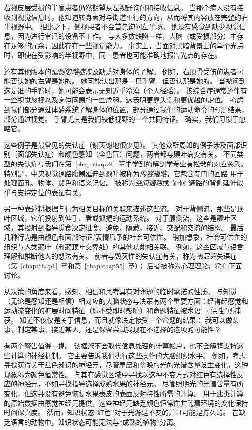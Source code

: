 右视皮层受损的半盲患者仍然期望从左视野询问和接收信息。
当那个病人没有接收到视觉信息时，他知道转身面对与街道平行的方向，从而将其内容放在完整的右半视野中。
相比之下，侧视患者不会首先询问左半场。
她没有感觉到缺少视觉信息，因为进行审讯的设备不工作。
与大多数缺陷一样，大脑（或受损部分）中存在足够的冗余，因此存在一些视觉能力。
事实上，当面对黑暗背景上的单个光点时，即使在受影响的半视野中，同一患者也可能准确地报告光点的存在。


还有其他版本的\textit{偏侧忽略症}涉及缺乏对身体的了解。
例如，右顶骨受伤的患者可能否认她的左臂是她的。
她可能认出那是一只手臂，但否认那是她的。
当被问到这是谁的手臂时，她可能会表示无知近乎冷漠（个人经验）。
该综合症通常还伴有一些视觉忽视以及身体同侧的一些虚弱，这表明更靠头侧和更优越的定位。
考虑到我们部分通过体感系统了解身体的位置，部分通过我们的运动命令的预测结果，部分通过视觉。
手臂尤其是我们较低视野的一个共同特征。
确实，我们习惯于忽略它。


这些例子是最常见的失认症（谢天谢地很少见）。
其他众所周知的例子涉及面部识别（面部失认症）和颜色感知（全色盲）问题，两者都与颞叶病变有关。
不同类型的失认症与我们在第~\ref{chap:chap24}~章中学到的解剖学专业有松散的对应关系。
特别是，中央视觉通路腹侧延伸到颞叶被称为\textit{内容通路}，它包含专门的回路 用于处理面孔、物体、颜色和语义记忆。
被称为\textit{空间通路}或“如何”通路的背侧延伸似乎与支持定位的表征有关。


另一种表述将根据与行为相关目标的关联来描述这些流。
对于背侧流，那些是顶叶区域，它们投射到伸手、看或抓握的运动系统。
对于腹侧流，这些是颞叶区域，其投射到指导觅食决定进食、避免、隐藏、接近、交配和交流的结构。
最后几种行为是由颜色和面部特征/表情赋予的社会可供性。
稍加想象，社会可供性的组织与人类颞叶（和颞顶叶交界处）的其他功能相关联。
例如，这些区域与语言理解和推断他人的想法有关。
前者与毁灭性的失认症有关，称为\textit{韦尼克}失语症（第~\ref{chap:chap1}~章和第~\ref{chap:chap55}~章）；
后者被称为心理理论，将在下面讨论。


从决策的角度来看，感知、相信和思考具有对命题的临时承诺的性质。
与知觉（无论是感知还是相信）相对应的大脑状态与决策有两个重要方面：经得起感觉和运动流变化的扩展时间特征（即不受即时影响）和命题特征被术语“可供性”所捕获。
知道不仅仅是关于信息，而且就像决定接受一个命题的结果：
我可以做某事，制定某事，接近某人，还是保留尝试我现在不选择的选项的可能性？


有两个警告值得一提。
该框架不会取代信息处理的计算帐户，也不会解释支持这些计算的神经机制。
它主要告诉我们执行这些操作的大脑组织水平。
例如，考虑寻找获得关于红色知识的神经元，尽管早晨和傍晚的光的光谱含量发生变化，这种现象称为颜色恒常性。
与其在感觉区域中寻找以这种不变方式对红色有选择性反应的神经元，不如寻找指导选择成熟水果的神经元。
尽管照明光的光谱含量有所变化，但这并没有避免恢复水果表皮的表面反射特性所需的计算。
用于此类计算的原始数据由感觉神经元提供，这些神经元缺乏颜色恒常性并随着环境的变化保持时间保真度。
然而，知识状态“红色”对于光源是不变的并且可能是持久的。
在缺乏语言的动物中，知识状态可能无法与“成熟的植物”分离。


